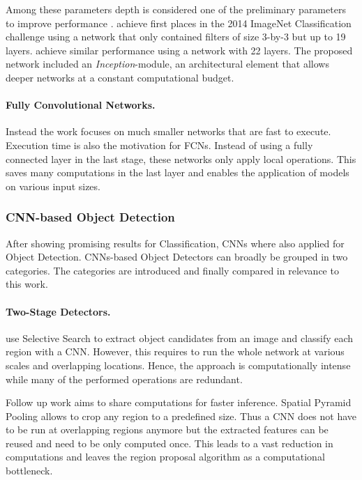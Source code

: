 Among these parameters depth is considered one of the preliminary parameters to improve performance \cite{He}. \citeauthor{Simonyan2014} \cite{Simonyan2014} achieve first places in the 2014 ImageNet Classification challenge using a network that only contained filters of size 3-by-3 but up to 19 layers. \citeauthor{Szegedy2014} \cite{Szegedy2014} achieve similar performance using a network with 22 layers. The proposed network included an \textit{Inception}-module, an architectural element that allows deeper networks at a constant computational budget. 


\paragraph{Fully Convolutional Networks.}

Instead the work focuses on much smaller networks that are fast to execute. Execution time is also the motivation for \acp{FCN}. Instead of using a fully connected layer in the last stage, these networks only apply local operations. This saves many computations in the last layer and enables the application of models on various input sizes.


\subsubsection{\ac{CNN}-based Object Detection}

After showing promising results for Classification, \acp{CNN} where also applied for Object Detection. \acp{CNN}-based Object Detectors can broadly be grouped in two categories. The categories are introduced and finally compared in relevance to this work.

\paragraph{Two-Stage Detectors.}

\citeauthor{Girshick2013} \cite{Girshick2013} use Selective Search \cite{Uijlings2013} to extract object candidates from an image and classify each region with a \ac{CNN}. However, this requires to run the whole network at various scales and overlapping locations. Hence, the approach is computationally intense while many of the performed operations are redundant.

Follow up work aims to share computations for faster inference. Spatial Pyramid Pooling \cite{He2014b} allows to crop any region to a predefined size. Thus a \ac{CNN} does not have to be run at overlapping regions anymore but the extracted features can be reused and need to be only computed once. This leads to a vast reduction in computations and leaves the region proposal algorithm as a computational bottleneck.

